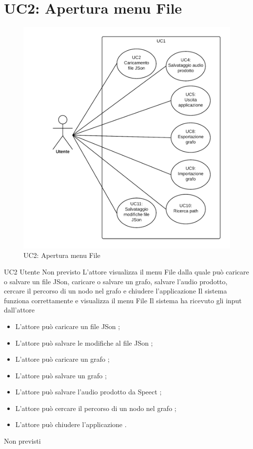 \documentclass[../AnalisideiRequisiti.tex]{subfiles}
\begin{document}
	\section{UC2: Apertura menu File}
	\begin{figure}[H]
		
		\centering
		
		\includegraphics[width=\textwidth]{../img/UC2.png}
		
		\caption{UC2: Apertura menu File}
		
	\end{figure}
	\UserCase
	{UC2}
	{Utente}
	{Non previsto}
	{L'attore visualizza il menu File dalla quale può caricare o salvare un file JSon, caricare o salvare un grafo, salvare l'audio prodotto, cercare il percorso di un nodo nel grafo e chiudere l'applicazione}
	{Il sistema funziona correttamente e visualizza il menu File}
	{Il sistema ha ricevuto gli input dall'attore}
	{	\begin{itemize}
		\item{} L'attore può caricare un file JSon ;
		\item{} L'attore può salvare le modifiche al file JSon ;
		\item{} L'attore può caricare un grafo ;
		\item{} L'attore può salvare un grafo ;
		\item{} L'attore può salvare l'audio prodotto da Speect ;
		\item{} L'attore può cercare il percorso di un nodo nel grafo ;
		\item{} L'attore può chiudere l'applicazione .
		\end{itemize}
	}
	{Non previsti}
\end{document}

